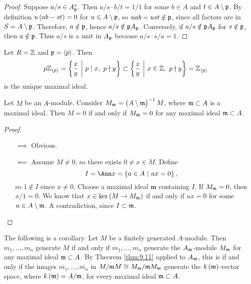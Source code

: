\begin{proof}
Suppose $ a / s \in A_{\mathfrak{p}}^* $. Then $ a / s \cdot b / t = 1 / 1 $ for some $ b \in A $ and $ t \in A \setminus \mathfrak{p} $. By definition $ u\br{ab - st} = 0 $ for $ u \in A \setminus \mathfrak{p} $, so $ uab = ust \notin \mathfrak{p} $, since all factors are in $ S = A \setminus \mathfrak{p} $. Therefore, $ a \notin \mathfrak{p} $, hence $ a / s \notin \mathfrak{p} A_{\mathfrak{p}} $. Conversely, if $ a / s \notin \mathfrak{p} A_{\mathfrak{p}} $ for $ s \notin \mathfrak{p} $, then $ a \notin \mathfrak{p} $. Thus $ a / s $ is a unit in $ A_{\mathfrak{p}} $ because $ a / s \cdot s / a = 1 $.
\end{proof}

\begin{example}
Let $ R = \mathbb{Z} $ and $ \mathfrak{p} = \left\langle p \right\rangle $. Then
$$ p\ZZ_{\abr{p}} = \cbr{\dfrac{x}{y} \st p \mid x, \ p \nmid y} \subset \cbr{\dfrac{x}{y} \st x \in \ZZ, \ p \nmid y} = \ZZ_{\abr{p}} $$
is the unique maximal ideal.
\end{example}

\begin{proposition}
Let $ M $ be an $ A $-module. Consider $ M_\mmm = \br{A \setminus \mmm}^{-1}M $, where $ \mathfrak{m} \subset A $ is a maximal ideal. Then $ M = 0 $ if and only if $ M_{\mathfrak{m}} = 0 $ for any maximal ideal $ \mathfrak{m} \subset A $.
\end{proposition}

\begin{proof}
\hfill
\begin{itemize}
\item[$ \implies $] Obvious.
\item[$ \impliedby $] Assume $ M \ne 0 $, so there exists $ 0 \ne x \in M $. Define
$$ I = \Ann x = \cbr{a \in A \st ax = 0}, $$
so $ 1 \notin I $ since $ x \ne 0 $. Choose a maximal ideal $ \mathfrak{m} $ containing $ I $. If $ M_{\mathfrak{m}} = 0 $, then $ x / 1 = 0 $. We know that $ x \in \ker \br{M \to M_\mmm} $ if and only if $ ux = 0 $ for some $ u \in A \setminus \mathfrak{m} $. A contradiction, since $ I \subset \mathfrak{m} $.
\end{itemize}
\end{proof}

The following is a corollary. Let $ M $ be a finitely generated $ A $-module. Then $ m_1, \dots, m_n $ generate $ M $ if and only if $ m_1, \dots, m_n $ generate the $ A_{\mathfrak{m}} $-module $ M_{\mathfrak{m}} $ for any maximal ideal $ \mathfrak{m} \subset A $. By Theorem \ref{thm:9.11} applied to $ A_{\mathfrak{m}} $, this is if and only if the images $ \overline{m_1}, \dots, \overline{m_n} $ in $ M / \mathfrak{m} M \cong M_{\mathfrak{m}} / \mathfrak{m} M_{\mathfrak{m}} $ generate the $ k\br{\mmm} $-vector space, where $ k\br{\mmm} = A / \mmm $, for every maximal ideal $ \mathfrak{m} \subset A $.

